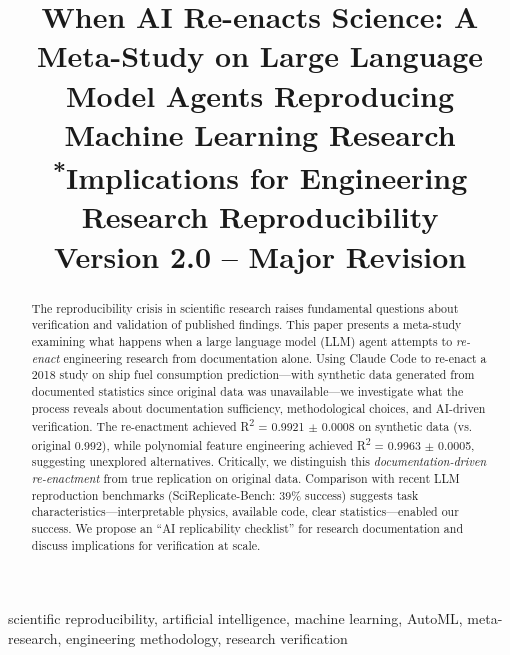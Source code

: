 \documentclass[conference]{IEEEtran}
\begin{document}
\title{When AI Re-enacts Science: A Meta-Study on Large Language Model Agents Reproducing Machine Learning Research\\
{\footnotesize \textsuperscript{*}Implications for Engineering Research Reproducibility}\\[0.5em]
{\small Version 2.0 -- Major Revision}}

\author{
}

\maketitle

\begin{abstract}
The reproducibility crisis in scientific research raises fundamental questions about verification and validation of published findings. This paper presents a meta-study examining what happens when a large language model (LLM) agent attempts to \textit{re-enact} engineering research from documentation alone. Using Claude Code to re-enact a 2018 study on ship fuel consumption prediction---with synthetic data generated from documented statistics since original data was unavailable---we investigate what the process reveals about documentation sufficiency, methodological choices, and AI-driven verification. The re-enactment achieved R\textsuperscript{2} = 0.9921 $\pm$ 0.0008 on synthetic data (vs. original 0.992), while polynomial feature engineering achieved R\textsuperscript{2} = 0.9963 $\pm$ 0.0005, suggesting unexplored alternatives. Critically, we distinguish this \textit{documentation-driven re-enactment} from true replication on original data. Comparison with recent LLM reproduction benchmarks (SciReplicate-Bench: 39\% success) suggests task characteristics---interpretable physics, available code, clear statistics---enabled our success. We propose an ``AI replicability checklist'' for research documentation and discuss implications for verification at scale.
\end{abstract}

\begin{IEEEkeywords}
scientific reproducibility, artificial intelligence, machine learning, AutoML, meta-research, engineering methodology, research verification
\end{IEEEkeywords}
\end{document}
